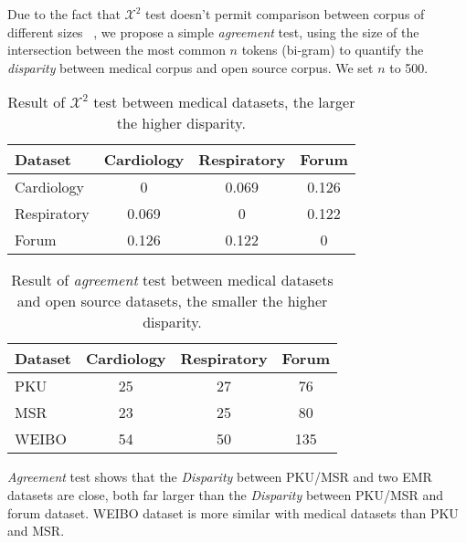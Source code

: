 Due to the fact that $\mathcal{X}^2$ test doesn't permit comparison between corpus of different sizes ~\cite{DBLP:conf/emnlp/KilgarriffR98}, we propose a simple \textit{agreement} test, using the size of the intersection between the most common $n$ tokens (bi-gram) to quantify the \textit{disparity} between medical corpus and open source corpus.  We set $n$ to 500.

\begin{table}[th]
\small
\centering
\caption{Result of $\mathcal{X}^2$ test between medical datasets, the larger the higher disparity.}\label{table:x2test}
\begin{adjustbox}{width=7.7cm}
\begin{tabular}{lccc}
\hline
Dataset & Cardiology & Respiratory & Forum\\
\hline
Cardiology & 0 & 0.069 & 0.126\\
Respiratory & 0.069 & 0 & 0.122\\
Forum & 0.126 & 0.122 & 0\\
\hline
\end{tabular}
\end{adjustbox}
\end{table}

\begin{table}[th]
\centering
\small
\caption{Result of \textit{agreement} test between medical datasets and open source datasets, the smaller the higher disparity.}\label{table:simpletest}
\begin{tabular}{lccc}
\hline
Dataset & Cardiology & Respiratory & Forum\\
\hline
PKU & 25 & 27 & 76\\
MSR & 23 & 25 & 80\\
WEIBO & 54 & 50 & 135\\
\hline
\end{tabular}
\end{table}



\textit{Agreement} test shows that the \textit{Disparity} between PKU/MSR and two EMR datasets are close, both far larger than the \textit{Disparity} between PKU/MSR and forum dataset. WEIBO dataset is more similar with medical datasets than PKU and MSR.

